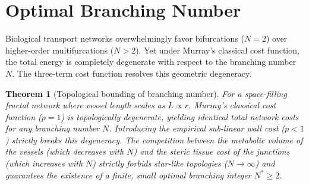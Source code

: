 \documentclass[11pt,a4paper]{article}
\newtheorem{theorem}{Theorem}
\theoremstyle{remark}
\begin{document}
\section{Optimal Branching Number}
\label{sec:branching_number}

Biological transport networks overwhelmingly favor bifurcations ($N=2$) over
higher-order multifurcations ($N>2$). Yet under Murray's classical cost
function, the total energy is completely degenerate with respect to the
branching number $N$. The three-term cost function resolves this geometric
degeneracy.

\begin{theorem}[Topological bounding of branching number]
\label{thm:Nstar}
For a space-filling fractal network where vessel length scales as $L \propto r$,
Murray's classical cost function ($p=1$) is topologically degenerate, yielding
identical total network costs for any branching number $N$. Introducing the
empirical sub-linear wall cost ($p<1$) strictly breaks this degeneracy. The
competition between the metabolic volume of the vessels (which decreases with
$N$) and the steric tissue cost of the junctions (which increases with $N$)
strictly forbids star-like topologies ($N \to \infty$) and guarantees the
existence of a finite, small optimal branching integer $N^* \ge 2$.
\end{theorem}
\end{document}
